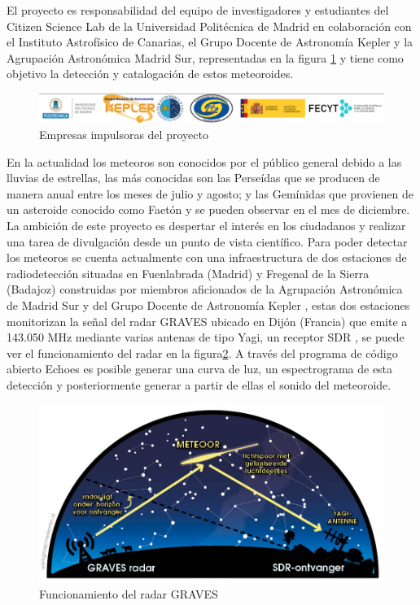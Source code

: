 El proyecto es responsabilidad del equipo de investigadores y estudiantes del Citizen Science Lab de la Universidad Politécnica de Madrid en colaboración con el Instituto Astrofísico de Canarias, el Grupo Docente de Astronomía Kepler y la Agrupación Astronómica Madrid Sur, representadas en la figura \ref{fig:empresas} y tiene como objetivo la detección y catalogación de estos meteoroides.

\begin{figure} [h]
    \centering
    \includegraphics[width=\textwidth]{include/figuras/Empresas_proyecto.png}
    \caption{Empresas impulsoras del proyecto}
    \label{fig:empresas}
\end{figure}

En la actualidad los meteoros son conocidos por el público general debido a las lluvias de estrellas, las más conocidas son las Perseídas que se producen de manera anual entre los meses de julio y agosto; y las Gemínidas que provienen de un asteroide conocido como Faetón y se pueden observar en el mes de diciembre. La ambición de este proyecto es despertar el interés en los ciudadanos y realizar una tarea de divulgación desde un punto de vista científico. 
Para poder detectar los meteoros se cuenta actualmente con una infraestructura de dos estaciones de radiodetección situadas en Fuenlabrada (Madrid) y Fregenal de la Sierra (Badajoz) construidas por miembros aficionados de la Agrupación Astronómica de Madrid Sur y del Grupo Docente de Astronomía Kepler \cite{kepler}, estas dos estaciones monitorizan la señal del radar GRAVES \cite{graves} ubicado en Dijón (Francia) que emite a 143.050 MHz mediante varias antenas de tipo Yagi, un receptor SDR \cite{ulversoy2010software}, se puede ver el funcionamiento del radar en la figura\ref{fig:radar}. A través del programa de código abierto Echoes \cite{echoes} es posible generar una curva de luz, un espectrograma de esta detección y posteriormente generar a partir de ellas el sonido del meteoroide. 

\begin{figure} [h]
    \centering
    \includegraphics[scale=0.35]{include/figuras/Radar.jpg}
    \caption{Funcionamiento del radar GRAVES}
    \label{fig:radar}
\end{figure}

